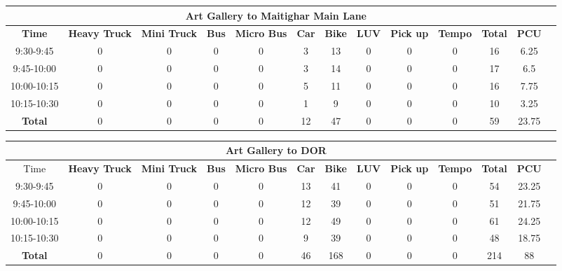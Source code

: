 \begin{landscape}
\centering
\begin{table}[h!]
\centering
\begin{tabular}{|c|c|c|c|c|c|c|c|c|c|c|c|c|}
    \hline
    \multicolumn{12}{|c|}{\textbf{Art Gallery to Maitighar Main Lane}} \\
    \hline
    \textbf{Time} & \textbf{Heavy Truck} & \textbf{Mini Truck} & \textbf{Bus} & \textbf{Micro Bus} & \textbf{Car} & \textbf{Bike} & \textbf{LUV} & \textbf{Pick up} & \textbf{Tempo} & \textbf{\textbf{Total}} & \textbf{PCU} \\
    \hline
    9:30-9:45	&0	&0	&0	&0	&3	&13	&0	&0	&0	&16	&6.25 \\ \hline
    9:45-10:00	&0	&0	&0	&0	&3	&14	&0	&0	&0	&17	&6.5 \\ \hline
    10:00-10:15	&0	&0	&0	&0	&5	&11	&0	&0	&0	&16	&7.75 \\ \hline
    10:15-10:30	&0	&0	&0	&0	&1	&9	&0	&0	&0	&10	&3.25 \\ \hline
    \textbf{Total}	    &0	&0	&0	&0	&12	&47	&0	&0	&0	&59	&23.75 \\ \hline


\end{tabular}

\vspace{0.5cm}

\begin{tabular}{|c|c|c|c|c|c|c|c|c|c|c|c|c|}
    \hline
    \multicolumn{12}{|c|}{\textbf{Art Gallery to DOR}} \\
    \hline
        Time & \textbf{Heavy Truck} & \textbf{Mini Truck} & \textbf{Bus} & \textbf{Micro Bus} & \textbf{Car} & \textbf{Bike} & \textbf{LUV} & \textbf{Pick up} & \textbf{Tempo} & \textbf{\textbf{Total}} & \textbf{PCU} \\
    \hline
9:30-9:45	&0	&0	&0	&0	&13	&41	&0	&0	&0	&54	&23.25 \\ \hline
9:45-10:00	&0	&0	&0	&0	&12	&39	&0	&0	&0	&51	&21.75 \\ \hline
10:00-10:15	&0	&0	&0	&0	&12	&49	&0	&0	&0	&61	&24.25 \\ \hline
10:15-10:30	&0	&0	&0	&0	&9	&39	&0	&0	&0	&48	&18.75 \\ \hline
\textbf{Total}	&0	&0	&0	&0	&46	&168	&0	&0	&0 &214 &88 \\ \hline

\end{tabular}


\end{table}
\end{landscape}
